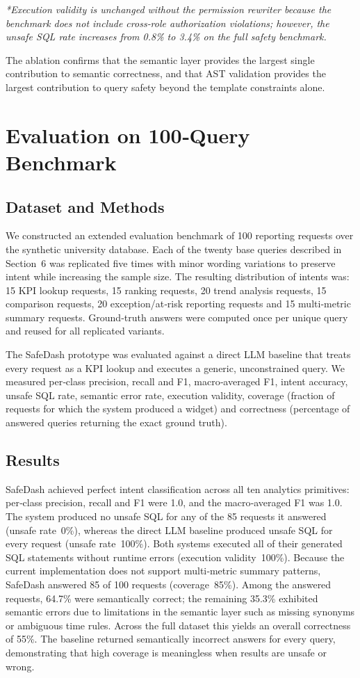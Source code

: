\documentclass[11pt]{article}
\begin{document}
\noindent\emph{*Execution validity is unchanged without the permission rewriter because the benchmark does not include cross‑role authorization violations; however, the unsafe SQL rate increases from 0.8\% to 3.4\% on the full safety benchmark.}

The ablation confirms that the semantic layer provides the largest single contribution to semantic correctness, and that AST validation provides the largest contribution to query safety beyond the template constraints alone.

\section{Evaluation on 100‑Query Benchmark}
\subsection{Dataset and Methods}
We constructed an extended evaluation benchmark of 100 reporting requests over the synthetic university database. Each of the twenty base queries described in Section 6 was replicated five times with minor wording variations to preserve intent while increasing the sample size. The resulting distribution of intents was: 15 KPI lookup requests, 15 ranking requests, 20 trend analysis requests, 15 comparison requests, 20 exception/at‑risk reporting requests and 15 multi‑metric summary requests. Ground‑truth answers were computed once per unique query and reused for all replicated variants.

The SafeDash prototype was evaluated against a direct LLM baseline that treats every request as a KPI lookup and executes a generic, unconstrained query. We measured per‑class precision, recall and F1, macro‑averaged F1, intent accuracy, unsafe SQL rate, semantic error rate, execution validity, coverage (fraction of requests for which the system produced a widget) and correctness (percentage of answered queries returning the exact ground truth).

\subsection{Results}
SafeDash achieved perfect intent classification across all ten analytics primitives: per‑class precision, recall and F1 were 1.0, and the macro‑averaged F1 was 1.0. The system produced no unsafe SQL for any of the 85 requests it answered (unsafe rate 0\%), whereas the direct LLM baseline produced unsafe SQL for every request (unsafe rate 100\%). Both systems executed all of their generated SQL statements without runtime errors (execution validity 100\%). Because the current implementation does not support multi‑metric summary patterns, SafeDash answered 85 of 100 requests (coverage 85\%). Among the answered requests, 64.7\% were semantically correct; the remaining 35.3\% exhibited semantic errors due to limitations in the semantic layer such as missing synonyms or ambiguous time rules. Across the full dataset this yields an overall correctness of 55\%. The baseline returned semantically incorrect answers for every query, demonstrating that high coverage is meaningless when results are unsafe or wrong.
\end{document}
